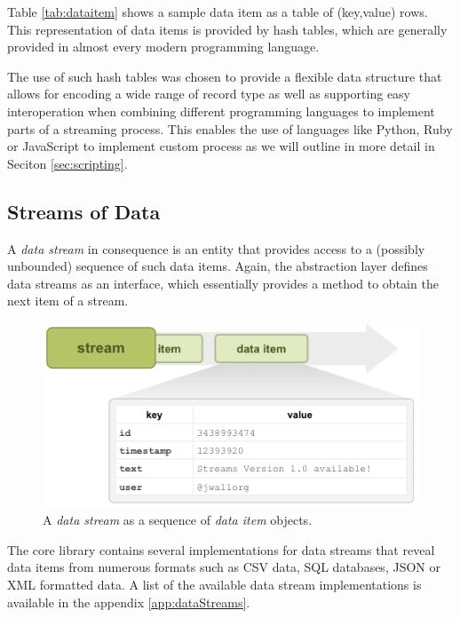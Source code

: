 Table \ref{tab:dataitem} shows a sample data item as a table of
(key,value) rows. This representation of data items is provided
by hash tables, which are generally provided in almost every modern
programming language.

The use of such hash tables was chosen to provide a flexible data
structure that allows for encoding a wide range of record type as well
as supporting easy interoperation when combining different programming
languages to implement parts of a streaming process. This enables the
use of languages like Python, Ruby or JavaScript to implement custom
process as we will outline in more detail in Seciton
\ref{sec:scripting}.

\subsection*{Streams of Data}
A {\em data stream} in consequence is an entity that provides access
to a (possibly unbounded) sequence of such data items. Again, the
\streams abstraction layer defines data streams as an interface, which
essentially provides a method to obtain the next item of a stream.

\begin{figure}[h1]
  \begin{center}
    \includegraphics[scale=0.5]{graphics/stream-items.png}
  \end{center}
  \caption{\label{fig:datastream}A {\em data stream} as a sequence of {\em data item} objects.}
\end{figure}

The core \streams library contains several implementations for data
streams that reveal data items from numerous formats such as CSV data,
SQL databases, JSON or XML formatted data. A list of the available
data stream implementations is available in the appendix \ref{app:dataStreams}.

